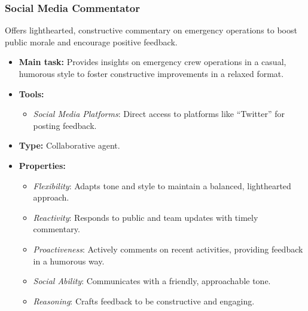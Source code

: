 \subsubsection{Social Media Commentator}

Offers lighthearted, constructive commentary on emergency operations to boost public morale and encourage positive feedback.

\begin{itemize}
    \item \textbf{Main task:} Provides insights on emergency crew operations in a casual, humorous style to foster constructive improvements in a relaxed format.
    \item \textbf{Tools:} 
    \begin{itemize}
        \item \emph{Social Media Platforms}: Direct access to platforms like ``Twitter'' for posting feedback.
    \end{itemize}
    \item \textbf{Type:} Collaborative agent.
    \item \textbf{Properties:}
    \begin{itemize}
        \item \emph{Flexibility}: Adapts tone and style to maintain a balanced, lighthearted approach.
        \item \emph{Reactivity}: Responds to public and team updates with timely commentary.
        \item \emph{Proactiveness}: Actively comments on recent activities, providing feedback in a humorous way.
        \item \emph{Social Ability}: Communicates with a friendly, approachable tone.
        \item \emph{Reasoning}: Crafts feedback to be constructive and engaging.
    \end{itemize}
\end{itemize}
